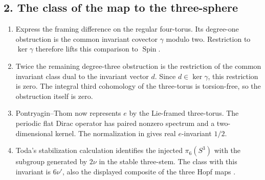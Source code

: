 \subsection*{2. The class of the map to the three-sphere}
\RungOne
\begin{enumerate}[label=\arabic*.,leftmargin=*]
\item Express the framing difference on the regular four-torus.
Its degree-one obstruction is the common invariant covector $\gamma$
modulo two.  Restriction to $\ker\gamma$ therefore lifts this
comparison to $\operatorname{Spin}$.
\item Twice the remaining degree-three obstruction is the restriction
of the common invariant class dual to the invariant vector $d$.
Since $d\in\ker\gamma$, this restriction is zero.  The integral
third cohomology of the three-torus is torsion-free, so the obstruction
itself is zero.
\item Pontryagin--Thom now represents $e$ by the Lie-framed
three-torus.  The periodic flat Dirac operator has paired nonzero
spectrum and a two-dimensional kernel.  The normalization in
\cite[Theorem~4.14, p.~423]{mapsAPS2} gives real $e$-invariant $1/2$.
\item Toda's stabilization calculation identifies the injected
$\pi_6(S^3)$ with the subgroup generated by $2\nu$ in the stable
three-stem.  The class with this invariant is $6\nu'$, also the
displayed composite of the three Hopf maps
\cite[Theorem~4.1 and Corollaries~4.2--4.3]{mapsToda52}.
\end{enumerate}

